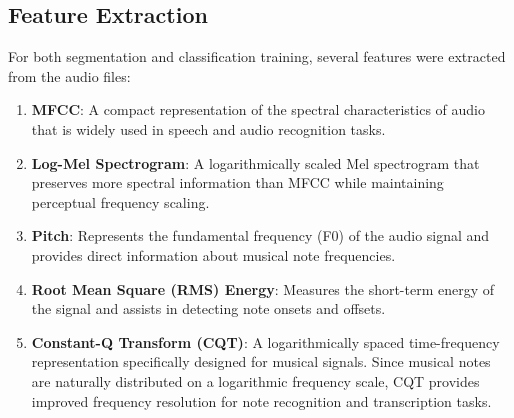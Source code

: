 \subsection{Feature Extraction}

For both segmentation and classification training, several features were extracted from the audio files:

\begin{enumerate}
    \item[I.] \textbf{MFCC}: A compact representation of the spectral characteristics of audio that is widely used in speech and audio recognition tasks.


    \item[II.] \textbf{Log-Mel Spectrogram}: A logarithmically scaled Mel spectrogram that preserves more spectral information than MFCC while maintaining perceptual frequency scaling.


    \item[III.] \textbf{Pitch}: Represents the fundamental frequency (F0) of the audio signal and provides direct information about musical note frequencies.


    \item[IV.] \textbf{Root Mean Square (RMS) Energy}: Measures the short-term energy of the signal and assists in detecting note onsets and offsets.


    \item[V.] \textbf{Constant-Q Transform (CQT)}: A logarithmically spaced time-frequency representation specifically designed for musical signals. Since musical notes are naturally distributed on a logarithmic frequency scale, CQT provides improved frequency resolution for note recognition and transcription tasks.

\end{enumerate}

